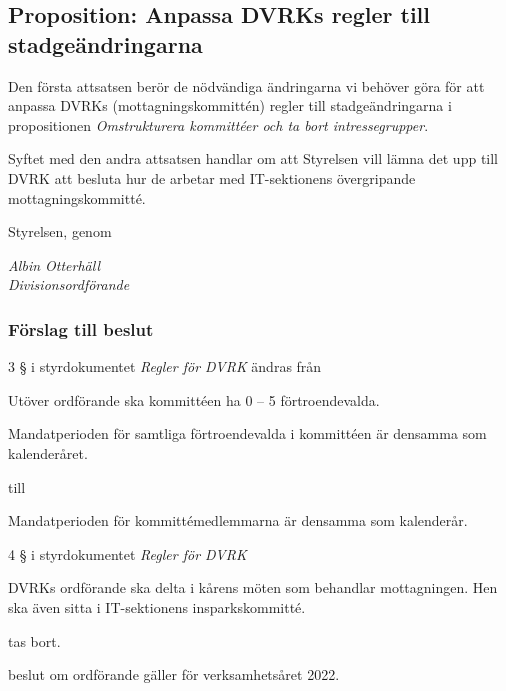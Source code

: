 \documentclass[protokoll]{dvd}
\begin{document}
\newpage

\subsection{Proposition: Anpassa DVRKs regler till stadgeändringarna}

Den första attsatsen berör de nödvändiga ändringarna vi behöver göra för att anpassa DVRKs (mottagningskommittén) regler till stadgeändringarna i propositionen \emph{Omstrukturera kommittéer och ta bort intressegrupper}.

Syftet med den andra attsatsen handlar om att Styrelsen vill lämna det upp till DVRK att besluta hur de arbetar med IT-sektionens övergripande mottagningskommitté.

Styrelsen, genom

\emph{Albin Otterhäll\\Divisionsordförande}

\subsubsection*{Förslag till beslut}

\begin{attsatser}

\item 3 § i styrdokumentet \emph{Regler för DVRK} ändras från
    \begin{displayquote}
        Utöver ordförande ska kommittéen ha 0 – 5 förtroendevalda.

        Mandatperioden för samtliga förtroendevalda i kommittéen är densamma som kalenderåret.
    \end{displayquote}

    till

    \begin{displayquote}
        Mandatperioden för kommittémedlemmarna är densamma som kalenderår.
    \end{displayquote}

    \item 4 § i styrdokumentet \emph{Regler för DVRK}
        \begin{displayquote}
            DVRKs ordförande ska delta i kårens möten som behandlar mottagningen.
            Hen ska även sitta i IT-sektionens insparkskommitté.
        \end{displayquote}

        tas bort.
    \item beslut om ordförande gäller för verksamhetsåret 2022.

\end{attsatser}
\end{document}
